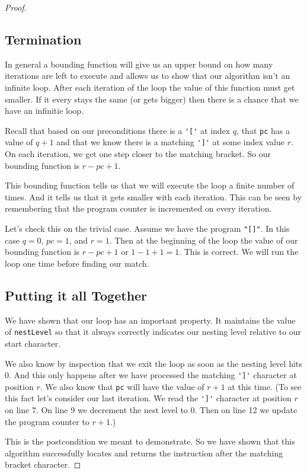 \documentclass[10pt]{article}
\newcommand{\inl}{\lstinline[breaklines=true]}
\begin{document}
\begin{proof}
\subsection*{Termination}
In general a bounding function will give us an upper bound on how many 
iterations are left to execute and allows us to show that our algorithm isn't
an infinite loop. After each iteration of the loop the value of this 
function must get smaller. If it every stays the same (or gets bigger) then
there is a chance that we have an infinitie loop.

Recall that based on our preconditions there is a \inl!'['! at index $q$,
that \inl!pc! has a value of $q + 1$ and that we know there is a matching
\inl!']'! at some index value $r$. On each iteration, we get one step closer
to the matching bracket. So our bounding function is $r - pc + 1$.

This bounding function tells us that we will execute the loop a finite
number of times. And it tells us that it gets smaller with each iteration.
This can be seen by remembering that the program counter is incremented on
every iteration.

Let's check this on the trivial case. Assume we have the program
\inl!"[]"!. In this case $q=0$, $pc=1$, and $r=1$. Then at the beginning
of the loop the value of our bounding function is $r - pc + 1$ or
$1 - 1 + 1 = 1$. This is correct. We will run the loop one time before
finding our match.


\subsection*{Putting it all Together}
We have shown that our loop has an important property. It maintains the value
of \inl!nestLevel! so that it always correctly indicates our nesting level
relative to our start character. 

We also know by inspection that we exit the loop as soon as the nesting
level hits 0. And this only happens after we have processed the
matching \inl!']'! character at position $r$. We also know that 
\inl!pc! will have the value of $r+1$ at this time. (To see this fact
let's consider our last iteration. We read the \inl!']'! character at position
$r$ on line 7. On line 9 we decrement the nest level to 0. Then on line 12 we
update the program counter to $r+1$.)

This is the postcondition we meant to demonstrate. So we have shown that this
algorithm successfully locates and returns the instruction after the matching
bracket character.
\end{proof}
\end{document}
